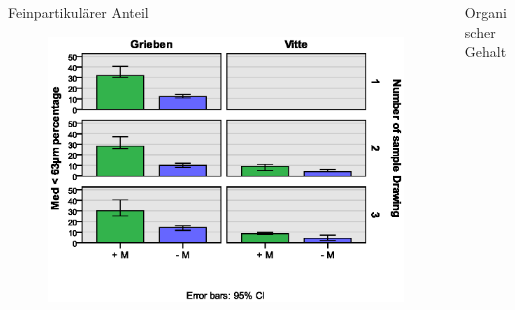 \documentclass[xcolor=dvipsnames]{beamer}
\begin{document}
\begin{frame}
\begin{columns}
\begin{column}{5.5cm}
Feinpartikulärer Anteil
\begin{figure}
\includegraphics[width=\textwidth]{images/sedimentparameter/S_Parameter_63_neu1.eps}
\end{figure}
\end{column}
\begin{column}{5.5cm}
\pause
Organischer Gehalt
\end{column}
\end{columns}
\end{frame}
\end{document}
